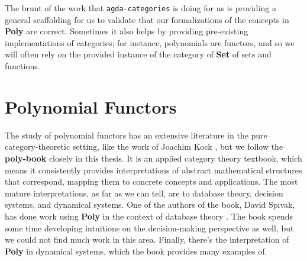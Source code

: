 The brunt of the work that \texttt{agda-categories} is doing for us is providing a general scaffolding for us to validate that our formalizations of the concepts in \textbf{Poly} are correct. Sometimes it also helps by providing pre-existing implementations of categories; for instance, polynomials are functors, and so we will often rely on the provided instance of the category of \textbf{Set} of sets and functions.

\section{Polynomial Functors}

The study of polynomial functors has an extensive literature in the pure category-theoretic setting, like the work of Joachim Kock \cite{kockpoly}\cite{kock2009polynomial}, but we follow the \textbf{poly-book} closely in this thesis. It is an applied category theory textbook, which means it consistently provides interpretations of abstract mathematical structures that correspond, mapping them to concrete concepts and applications. The most mature interpretations, as far as we can tell, are to database theory, decision systems, and dynamical systems. One of the authors of the book, David Spivak, has done work using \textbf{Poly} in the context of database theory \cite{spivak2023functorial}. The book spends some time developing intuitions on the decision-making perspective as well, but we could not find much work in this area. Finally, there's the interpretation of \textbf{Poly} in dynamical systems, which the book provides many examples of.

